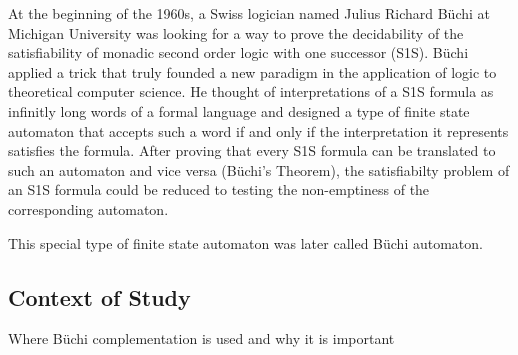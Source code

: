 At the beginning of the 1960s, a Swiss logician named Julius Richard Büchi at Michigan University was looking for a way to prove the decidability of the satisfiability of monadic second order logic with one successor (S1S). Büchi applied a trick that truly founded a new paradigm in the application of logic to theoretical computer science. He thought of interpretations of a S1S formula as infinitly long words of a formal language and designed a type of finite state automaton that accepts such a word if and only if the interpretation it represents satisfies the formula. After proving that every S1S formula can be translated to such an automaton and vice versa (Büchi's Theorem), the satisfiabilty problem of an S1S formula could be reduced to testing the non-emptiness of the corresponding automaton.

This special type of finite state automaton was later called Büchi automaton.

\subsection{Context of Study}

Where Büchi complementation is used and why it is important

